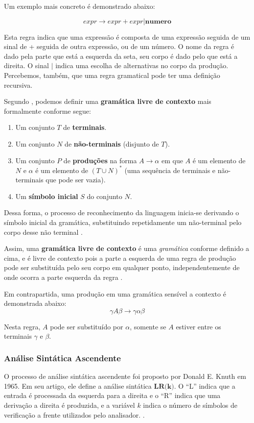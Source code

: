 Um exemplo mais concreto é demonstrado abaixo:

\[
expr \rightarrow expr + expr | \textbf{numero}
\]

Esta regra indica que uma expressão é composta de uma expressão seguida de um
sinal de + seguida de outra expressão, ou de um número. O nome da regra é dado
pela parte que está a esquerda da seta, seu corpo é dado pelo que está a
direita. O sinal \(|\) indica uma escolha de alternativas no corpo da
produção. Percebemos, também, que uma regra gramatical pode ter uma
definição recursiva.

Segundo , podemos definir uma \textbf{gramática livre de
contexto} mais formalmente conforme segue:
\begin{enumerate}
	\item Um conjunto \(T\) de \textbf{terminais}.
	\item Um conjunto \(N\) de \textbf{não-terminais} (disjunto de \(T\)).
	\item Um conjunto \(P\) de \textbf{produções} na forma \(A \rightarrow \alpha\)
				em que \(A\) é um elemento de \(N\) e \(\alpha\) é um elemento de
				\((T \cup N)^*\) (uma sequência de terminais e não-terminais que
				pode ser vazia).
	\item Um \textbf{símbolo inicial} \(S\) do conjunto \(N\).
\end{enumerate}

Dessa forma, o processo de reconhecimento da linguagem inicia-se derivando o
símbolo inicial da gramática, substituindo repetidamente um não-terminal pelo
corpo desse não terminal \cite{new-dragon-pt}.

Assim, uma \textbf{gramática livre de contexto} é uma \emph{gramática}
conforme definido a cima, e é livre de contexto pois a parte a esquerda de uma
regra de produção pode ser substituída pelo seu corpo em qualquer ponto,
independentemente de onde ocorra a parte esquerda da regra \cite{louden97-pt}.

Em contrapartida, uma produção em uma gramática sensível a contexto é demonstrada
abaixo:
\[
	\gamma{}A{}\beta \rightarrow \gamma\alpha\beta
\]

Nesta regra, \(A\) pode ser substituído por \(\alpha\), somente se
\(A\) estiver entre os terminais \(\gamma\) e \(\beta\).

\subsubsection{Análise Sintática Ascendente}
\label{sec:asc_syntax_analisys}
O processo de análise sintática ascendente foi proposto por Donald E. Knuth
em 1965. Em seu artigo, ele define a análise sintática $\textbf{LR(k)}$. O
``L'' indica que a entrada é processada da esquerda para a direita e o ``R''
indica que uma derivação a direita é produzida, e a variável $k$ indica
o número de símbolos de verificação a frente utilizados pelo analisador.
\cite{louden97-pt}.

